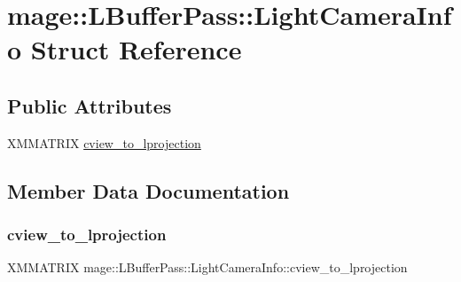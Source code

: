 \hypertarget{structmage_1_1_l_buffer_pass_1_1_light_camera_info}{}\section{mage\+:\+:L\+Buffer\+Pass\+:\+:Light\+Camera\+Info Struct Reference}
\label{structmage_1_1_l_buffer_pass_1_1_light_camera_info}
\subsection*{Public Attributes}
\begin{DoxyCompactItemize}
\item 
X\+M\+M\+A\+T\+R\+IX \hyperlink{structmage_1_1_l_buffer_pass_1_1_light_camera_info_ab98bb06712a999c24e043c542ab4b510}{cview\+\_\+to\+\_\+lprojection}
\end{DoxyCompactItemize}


\subsection{Member Data Documentation}
\hypertarget{structmage_1_1_l_buffer_pass_1_1_light_camera_info_ab98bb06712a999c24e043c542ab4b510}{}\label{structmage_1_1_l_buffer_pass_1_1_light_camera_info_ab98bb06712a999c24e043c542ab4b510} 
\subsubsection{\texorpdfstring{cview\+\_\+to\+\_\+lprojection}{cview\_to\_lprojection}}
{\footnotesize\ttfamily X\+M\+M\+A\+T\+R\+IX mage\+::\+L\+Buffer\+Pass\+::\+Light\+Camera\+Info\+::cview\+\_\+to\+\_\+lprojection}

